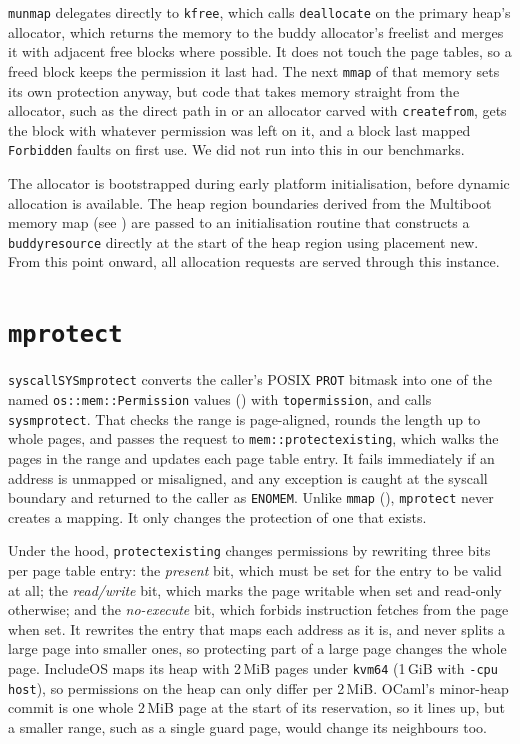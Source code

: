 \documentclass[12pt]{report}
\newcommand{\fullref}[1]{\Cref{#1}}
\renewcommand{\_}{\origunderscore\allowbreak}
\begin{document}
\texttt{munmap} delegates directly to \texttt{kfree}, which calls \texttt{deallocate} on the primary heap's allocator, which returns the memory to the buddy allocator's freelist and merges it with adjacent free blocks where possible. It does not touch the page tables, so a freed block keeps the permission it last had. The next \texttt{mmap} of that memory sets its own protection anyway, but code that takes memory straight from the allocator, such as the direct path in \fullref{sec:eval-posix-direct} or an allocator carved with \texttt{create\_from}, gets the block with whatever permission was left on it, and a block last mapped \texttt{Forbidden} faults on first use. We did not run into this in our benchmarks.

The allocator is bootstrapped during early platform initialisation, before dynamic allocation is available. The heap region boundaries derived from the Multiboot memory map (see \fullref{sec:includeos-memory-model}) are passed to an initialisation routine that constructs a \texttt{buddy\_resource} directly at the start of the heap region using placement new. From this point onward, all allocation requests are served through this instance.

\section{\texttt{mprotect}}
\label{sec:mprotect-impl}

\texttt{syscall\_SYS\_mprotect} converts the caller's POSIX \texttt{PROT\_*} bitmask into one of the named \texttt{os::mem::Permission} values () with \texttt{to\_permission}, and calls \texttt{\_\_sys\_mprotect}. That checks the range is page-aligned, rounds the length up to whole pages, and passes the request to \texttt{mem::protect\_existing}, which walks the pages in the range and updates each page table entry. It fails immediately if an address is unmapped or misaligned, and any exception is caught at the syscall boundary and returned to the caller as \texttt{ENOMEM}. Unlike \texttt{mmap} (), \texttt{mprotect} never creates a mapping. It only changes the protection of one that exists.

Under the hood, \texttt{protect\_existing} changes permissions by rewriting three bits per page table entry: the \emph{present} bit, which must be set for the entry to be valid at all; the \emph{read/write} bit, which marks the page writable when set and read-only otherwise; and the \emph{no-execute} bit, which forbids instruction fetches from the page when set. It rewrites the entry that maps each address as it is, and never splits a large page into smaller ones, so protecting part of a large page changes the whole page. IncludeOS maps its heap with 2\,MiB pages under \texttt{kvm64} (1\,GiB with \texttt{-cpu host}), so permissions on the heap can only differ per 2\,MiB. OCaml's minor-heap commit is one whole 2\,MiB page at the start of its reservation, so it lines up, but a smaller range, such as a single guard page, would change its neighbours too.
\end{document}
